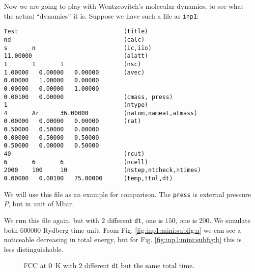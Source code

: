 Now we are going to play with Wentzcovitch's molecular dynamics, to see what the
actual ``dynamics'' it is. Suppose we have such a file as \texttt{inp1}:
\begin{verbatim}
Test                              (title)
nd                                (calc)
s       n                         (ic,iio)
11.00000                          (alatt)
1       1       1                 (nsc)
1.00000   0.00000   0.00000       (avec)
0.00000   1.00000   0.00000
0.00000   0.00000   1.00000
0.00100   0.00000                 (cmass, press)
1                                 (ntype)
4       Ar      36.00000          (natom,nameat,atmass)
0.00000   0.00000   0.00000       (rat)
0.50000   0.50000   0.00000
0.00000   0.50000   0.50000
0.50000   0.00000   0.50000
40                                (rcut)
6       6       6                 (ncell)
2000    100     10                (nstep,ntcheck,ntimes)
0.00000   0.00100   75.00000      (temp,ttol,dt)
\end{verbatim}
We will use this file as an example for comparison.
The \texttt{press} is external pressure $P$, but in unit of \si{\mega\bar}.


We run this file again, but with $2$ different \texttt{dt}, one is $150$, one is $200$.
We simulate both $600000$ Rydberg time unit. From Fig. \ref{fig:inp1:mini:subfig:a} we can see a noticeable
decreasing in total energy, but for Fig. \ref{fig:inp1:mini:subfig:b} this is less distinguishable. 
\begin{figure}[h]
  \hfill
  \caption{FCC  at \SI{0}{\kelvin} with $2$ different \texttt{dt} but the same total time.}
  \label{fig:inp1}   %
\end{figure}

